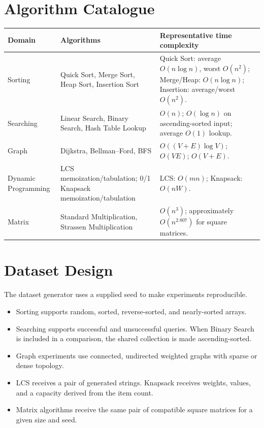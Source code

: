 \documentclass[11pt,a4paper]{report}
\begin{document}
\section{Algorithm Catalogue}
\begin{longtable}{p{}p{}p{}}
\toprule
\textbf{Domain} & \textbf{Algorithms} & \textbf{Representative time complexity}\\
\midrule
Sorting & Quick Sort, Merge Sort, Heap Sort, Insertion Sort &
Quick Sort: average $O(n\log n)$, worst $O(n^2)$; Merge/Heap: $O(n\log n)$; Insertion: average/worst $O(n^2)$.\\
Searching & Linear Search, Binary Search, Hash Table Lookup &
$O(n)$; $O(\log n)$ on ascending-sorted input; average $O(1)$ lookup.\\
Graph & Dijkstra, Bellman--Ford, BFS &
$O((V+E)\log V)$; $O(VE)$; $O(V+E)$.\\
Dynamic Programming & LCS memoization/tabulation; 0/1 Knapsack memoization/tabulation &
LCS: $O(mn)$; Knapsack: $O(nW)$.\\
Matrix & Standard Multiplication, Strassen Multiplication &
$O(n^3)$; approximately $O(n^{2.807})$ for square matrices.\\
\bottomrule
\end{longtable}

\section{Dataset Design}
The dataset generator uses a supplied seed to make experiments reproducible.

\begin{itemize}
    \item Sorting supports random, sorted, reverse-sorted, and nearly-sorted arrays.
    \item Searching supports successful and unsuccessful queries. When Binary
    Search is included in a comparison, the shared collection is made ascending-sorted.
    \item Graph experiments use connected, undirected weighted graphs with sparse or dense topology.
    \item LCS receives a pair of generated strings. Knapsack receives weights,
    values, and a capacity derived from the item count.
    \item Matrix algorithms receive the same pair of compatible square matrices
    for a given size and seed.
\end{itemize}
\end{document}
